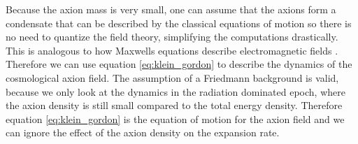 \documentclass[twoside,a4paper, 12pt]{article}
\numberwithin{equation}{section}
\begin{document}
\noindent
Because the axion mass is very small, one
can assume that the axions form a condensate
that can be described by the classical equations
of motion so there is no need to quantize the
field theory, simplifying the computations
drastically. This is analogous to how Maxwells
equations describe electromagnetic fields \cite[Chap. 4]{MarshAxionCosmo}.
Therefore we can use equation \eqref{eq:klein_gordon} to describe the dynamics
of the cosmological axion field.
The assumption of a Friedmann background is valid, because we only look at
the dynamics in the radiation dominated epoch, where the axion density
is still small compared to the total energy density.
Therefore equation \eqref{eq:klein_gordon} is the equation of motion for the axion field and we can ignore the effect of the axion density on the expansion rate.
\end{document}
